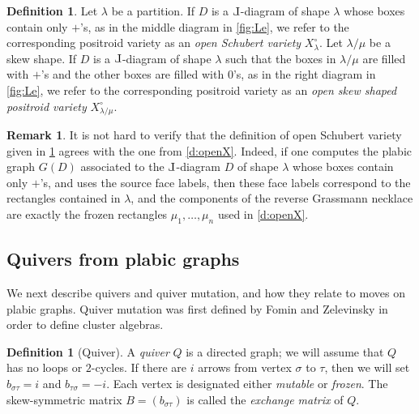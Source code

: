 \documentclass{amsart}
\def\Le{\hbox{\rotatebox[origin=c]{180}{$\Gamma$}}}
\theoremstyle{definition}
\newtheorem{definition}[thm]{Definition}
\newtheorem{remark}[thm]{Remark}
\numberwithin{equation}{section}
\begin{document}
\begin{definition}\label{def:openSchubert}
Let $\lambda$ be a partition.
If $D$ is a $\Le$-diagram of shape $\lambda$ whose boxes contain only $+$'s,
as in the middle diagram in 
 \cref{fig:Le}, we refer to the corresponding positroid variety
as an \emph{open Schubert variety} $X_{\lambda}^{\circ}$.
Let $\lambda/\mu$ be a skew shape.  
If $D$ is a $\Le$-diagram of shape $\lambda$ such that the boxes
in $\lambda/\mu$ are filled with $+$'s and the other boxes are filled 
with $0$'s, as in the right diagram in \cref{fig:Le},
we refer to the corresponding positroid variety
as an \emph{open skew shaped positroid variety} $X_{\lambda/\mu}^{\circ}$.
\end{definition}
\begin{remark}\label{rem:defopenSchubert}
It is not hard to verify that the definition of open Schubert variety
given in \cref{def:openSchubert} agrees with the one 
from \cref{d:openX}.  Indeed, if one computes the 
plabic graph $G(D)$ associated to the $\Le$-diagram $D$ of 
shape $\lambda$ whose boxes contain only $+$'s, and uses the 
source face labels, then these face labels correspond to the 
rectangles contained in $\lambda$, and the components 
	of the reverse Grassmann necklace are exactly the frozen rectangles
	$\mu_1,\dots,\mu_n$ used in \cref{d:openX}.
\end{remark}


\subsection{Quivers from plabic graphs}

We next describe quivers and quiver mutation, 
and how they relate to moves on plabic graphs.
Quiver mutation was first defined by Fomin and Zelevinsky \cite{ca1}
in order to define cluster algebras.  

\begin{definition}[Quiver]\label{quiver}
A \emph{quiver} $Q$ is a directed graph; we will assume that $Q$ has no 
loops or $2$-cycles.
If there are $i$ arrows from vertex $\sigma$ to $\tau$, then 
we will set $b_{\sigma \tau} = i$ and $b_{\tau \sigma} = -i$.
Each vertex is designated either  \emph{mutable} or \emph{frozen}.
The skew-symmetric matrix $B = (b_{\sigma \tau})$ is called the \emph{exchange matrix} of $Q$.
\end{definition}
\end{document}
